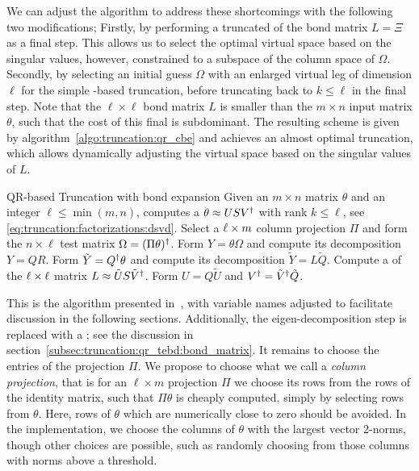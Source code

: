 We can adjust the algorithm to address these shortcomings with the following two modifications;
%
Firstly, by performing a truncated  of the bond matrix $L = \Xi$ as a final step.
%
This allows us to select the optimal virtual space based on the singular values, however, constrained to a subspace of the column space of $\Omega$.
%
Secondly, by selecting an initial guess $\Omega$ with an enlarged virtual leg of dimension $\ell$ for the simple -based truncation, before truncating back to $k \leq \ell$ in the final step.
%
Note that the $\ell \times \ell$ bond matrix $L$ is smaller than the $m \times n$ input matrix $\theta$, such that the cost of this final  is subdominant.
%
The resulting scheme is given by algorithm~\ref{algo:truncation:qr_cbe} and achieves an almost optimal truncation, which allows dynamically adjusting the virtual space based on the singular values of $L$.

\begin{Algorithm}{QR-based Truncation with bond expansion}{
    \label{algo:truncation:qr_cbe}
    \newcommand{\intermediateSize}{\ell}
    Given an $m \times n$ matrix $\theta$ and an integer $\intermediateSize \leq \min(m,n)$,
    computes a  $\theta \approx U S V^\dagger$ with rank $k \leq \intermediateSize$, see \eqref{eq:truncation:factorizations:dsvd}.
}
    \step Select a $\intermediateSize \times m$ column projection $\Pi$ and form the $n \times \ell$ test matrix $\Omega = (\Pi \theta)^\dagger$.
    \step \label{step:truncation:qr_cbe:QR}
    Form $Y = \theta \Omega$ and compute its  decomposition $Y = Q R$.
    \step \label{step:truncation:qr_cbe:LQ}
    Form $\tilde Y = Q^\dagger \theta$ and compute its  decomposition $\tilde Y = L \tilde{Q}$.
    \step \label{step:truncation:qr_cbe:bond_svd}
    Compute a  of the $\intermediateSize \times \intermediateSize$ matrix $L \approx \tilde U S \tilde V^\dagger$.
    \step Form $U = Q \tilde U$ and $V^\dagger = \tilde V^\dagger \tilde{Q}$.
\end{Algorithm}

This is the algorithm presented in~\cite[sec III]{unfried2023}, with variable names adjusted to facilitate discussion in the following sections.
%
Additionally, the eigen-decomposition step is replaced with a ; see the discussion in section~\ref{subsec:truncation:qr_tebd:bond_matrix}.
%
It remains to choose the entries of the projection $\Pi$.
%
We propose to choose what we call a \emph{column projection}, that is for an $\ell \times m$ projection $\Pi$ we choose its rows from the rows of the identity matrix, such that $\Pi\theta$ is cheaply computed, simply by selecting rows from $\theta$.
%
Here, rows of $\theta$ which are numerically close to zero should be avoided. In the  implementation, we choose the columns of $\theta$ with the largest vector 2-norms, though other choices are possible, such as randomly choosing from those columns with norms above a threshold.

